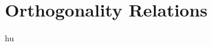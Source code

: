 \documentclass[../Project.tex]{subfiles}
\begin{document}
\newpage
\section{Orthogonality Relations}
hu
\end{document}
